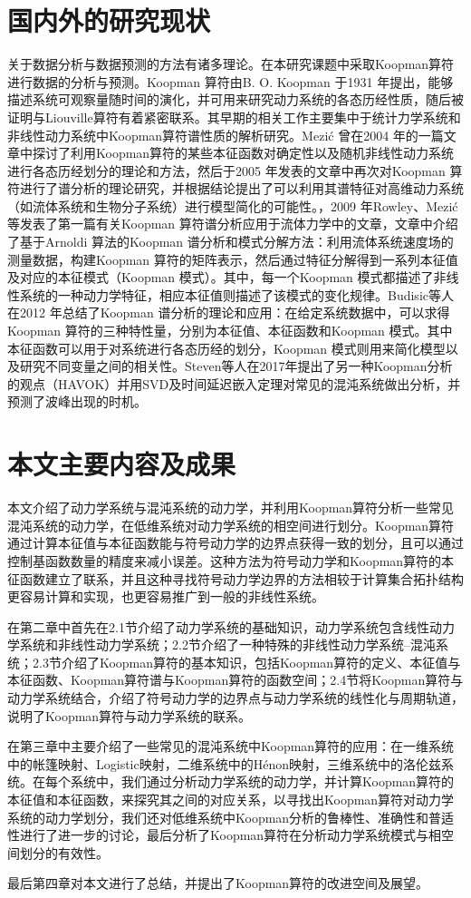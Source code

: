 \section{国内外的研究现状}
关于数据分析与数据预测的方法有诸多理论。在本研究课题中采取Koopman算符进行数据的分析与预测。Koopman 算符由B. O. Koopman 于1931 年提出，能够描述系统可观察量随时间的演化，并可用来研究动力系统的各态历经性质，随后被证明与Liouville算符有着紧密联系。其早期的相关工作主要集中于统计力学系统和非线性动力系统中Koopman算符谱性质的解析研究。Mezić 曾在2004 年的一篇文章中探讨了利用Koopman算符的某些本征函数对确定性以及随机非线性动力系统进行各态历经划分的理论和方法，然后于2005 年发表的文章中再次对Koopman 算符进行了谱分析的理论研究，并根据结论提出了可以利用其谱特征对高维动力系统（如流体系统和生物分子系统）进行模型简化的可能性。，2009 年Rowley、Mezić 等发表了第一篇有关Koopman 算符谱分析应用于流体力学中的文章，文章中介绍了基于Arnoldi 算法的Koopman 谱分析和模式分解方法：利用流体系统速度场的测量数据，构建Koopman 算符的矩阵表示，然后通过特征分解得到一系列本征值及对应的本征模式（Koopman 模式）。其中，每一个Koopman 模式都描述了非线性系统的一种动力学特征，相应本征值则描述了该模式的变化规律。Budisic等人在2012 年总结了Koopman 谱分析的理论和应用：在给定系统数据中，可以求得Koopman 算符的三种特性量，分别为本征值、本征函数和Koopman 模式。其中本征函数可以用于对系统进行各态历经的划分，Koopman 模式则用来简化模型以及研究不同变量之间的相关性。Steven等人在2017年提出了另一种Koopman分析的观点（HAVOK）并用SVD及时间延迟嵌入定理对常见的混沌系统做出分析，并预测了波峰出现的时机。

\section{本文主要内容及成果}
本文介绍了动力学系统与混沌系统的动力学，并利用Koopman算符分析一些常见混沌系统的动力学，在低维系统对动力学系统的相空间进行划分。Koopman算符通过计算本征值与本征函数能与符号动力学的边界点获得一致的划分，且可以通过控制基函数数量的精度来减小误差。这种方法为符号动力学和Koopman算符的本征函数建立了联系，并且这种寻找符号动力学边界的方法相较于计算集合拓扑结构更容易计算和实现，也更容易推广到一般的非线性系统。

在第二章中首先在2.1节介绍了动力学系统的基础知识，动力学系统包含线性动力学系统和非线性动力学系统；2.2节介绍了一种特殊的非线性动力学系统--混沌系统；2.3节介绍了Koopman算符的基本知识，包括Koopman算符的定义、本征值与本征函数、Koopman算符谱与Koopman算符的函数空间；2.4节将Koopman算符与动力学系统结合，介绍了符号动力学的边界点与动力学系统的线性化与周期轨道，说明了Koopman算符与动力学系统的联系。

在第三章中主要介绍了一些常见的混沌系统中Koopman算符的应用：在一维系统中的帐篷映射、Logistic映射，二维系统中的H\'{e}non映射，三维系统中的洛伦兹系统。在每个系统中，我们通过分析动力学系统的动力学，并计算Koopman算符的本征值和本征函数，来探究其之间的对应关系，以寻找出Koopman算符对动力学系统的动力学划分，我们还对低维系统中Koopman分析的鲁棒性、准确性和普适性进行了进一步的讨论，最后分析了Koopman算符在分析动力学系统模式与相空间划分的有效性。

最后第四章对本文进行了总结，并提出了Koopman算符的改进空间及展望。


% 
% 
